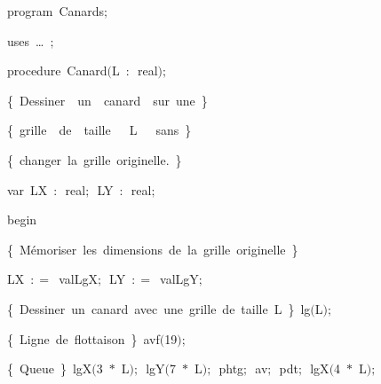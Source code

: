 
{
\parindent {}
\medskip

\carrenoir
\vspace{\neglskip}\mbox{\blc  \idt  \mcl program\idt \ Canards$;$
}\par 
\vspace{\neglskip}\mbox{\blc \blk\idt \mcl uses\idt \ \ldots\ $;$
}\par 
\medskip

\pagebreak[3] 
\vspace{\neglskip}\mbox{\blc  \blk\idt  \mcl procedure\idt \ Canard$($L\ $:$\ real$)$$;$}\par 
\vspace{\neglskip}\mbox{\blc  \blk\blk\idt  \cmt  \{\ Dessiner\ \ un\ \ canard\ \ sur\ une\ \}\idt }\par 
\vspace{\neglskip}\mbox{\blc  \blk\blk\idt  \cmt  \{\ grille\ \ de\ \ taille\ \ \ L\ \ \ sans\ \}\idt }\par 
\vspace{\neglskip}\mbox{\blc  \blk\blk\idt  \cmt  \{\ changer\ la\ grille\ originelle.\ \}\idt }\par 
\pagebreak[3] 
\vspace{\neglskip}\mbox{\blc  \blk\blk\idt  \mcl var\idt \ LX\ $:$\ real$;$\ LY\ $:$\ real$;$}\par 
\vspace{\neglskip}\mbox{\blc  \blk\idt  \mcl begin\idt }\par 
\vspace{\neglskip}\mbox{\blc  \blk\blk\idt  \cmt  \{\ Mémoriser\ les\ dimensions\ de\ la\ grille\ originelle\ \}\idt }\par 
\vspace{\neglskip}\mbox{\blc  \blk\blk\blk\blk\idt  LX\ $:$$=$\ valLgX$;$\ LY\ $:$$=$\ valLgY$;$}\par 
\vspace{\neglskip}\mbox{\blc  \blk\blk\idt  \cmt  \{\ Dessiner\ un\ canard\ avec\ une\ grille\ de\ taille\ L\ \}\idt \ lg$($L$)$$;$\ }\par 
\vspace{\neglskip}\mbox{\blc  \blk\blk\blk\blk\idt  \cmt  \{\ Ligne\ de\ flottaison\ \}\idt \ avf$($19$)$$;$\ }\par 
\vspace{\neglskip}\mbox{\blc  \blk\blk\blk\blk\idt  \cmt  \{\ Queue\ \}\idt \ lgX$($3\ $\ast$\ L$)$$;$\ lgY$($7\ $\ast$\ L$)$$;$\ phtg$;$\ av$;$\ pdt$;$\ lgX$($4\ $\ast$\ L$)$$;$\ }\par 
}
